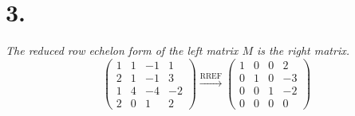 \documentclass[12pt]{article}
\begin{document}
\section*{3.}
\textit{The reduced row echelon form of the left matrix $M$ is the right
matrix.}
\begin{equation*}
	\begin{pmatrix}
		1 & 1 & -1 & 1 \\
		2 & 1 & -1 & 3 \\
		1 & 4 & -4 & -2 \\
		2 & 0 & 1 & 2
	\end{pmatrix}
	\xrightarrow{\text{RREF}}
	\begin{pmatrix}
		1 & 0 & 0 & 2 \\
		0 & 1 & 0 & -3 \\
		0 & 0 & 1 & -2 \\
		0 & 0 & 0 & 0
	\end{pmatrix}
\end{equation*}
\end{document}
